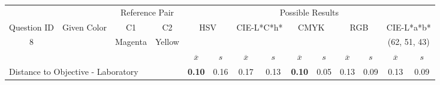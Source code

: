\begin{table}[H]
  \resizebox{\textwidth}{!} {
  \begin{tabular}{lccccccccccccc}
    \hline
    \multicolumn{1}{c}{}                              &                                      & \multicolumn{2}{c}{Reference Pair}                   & \multicolumn{10}{c}{Possible Results}                                                                                                                                                                                                                                                                                        \\ \cline{3-14}
    \multicolumn{1}{c}{\multirow{-2}{*}{Question ID}} & \multirow{-2}{*}{Given Color}        & C1                       & C2                         & \multicolumn{2}{c}{HSV}                                        & \multicolumn{2}{c}{CIE-L*C*h*}                                 & \multicolumn{2}{c}{CMYK}                                       & \multicolumn{2}{c}{RGB}                                        & \multicolumn{2}{c}{CIE-L*a*b*}                                 \\ \hline
    \multicolumn{1}{c}{8}                             & \cellcolor[HTML]{FF0000}{\color[HTML]{FFFFFF}(41, 21, 2)} & \multicolumn{1}{c|}{Magenta} & \multicolumn{1}{c|}{Yellow}  & \multicolumn{2}{c|}{\cellcolor[HTML]{FF0000}{\color[HTML]{FFFFFF}(41, 21, 2)}}      & \multicolumn{2}{c|}{\cellcolor[HTML]{FF6755}{\color[HTML]{FFFFFF}(48, 32, 12)}}       & \multicolumn{2}{c|}{\cellcolor[HTML]{FF8080}{\color[HTML]{FFFFFF}(53, 38, 25)}}       & \multicolumn{2}{c|}{\cellcolor[HTML]{FF8080}{\color[HTML]{FFFFFF}(53, 38, 25)}}       & \multicolumn{2}{c|}{\cellcolor[HTML]{FFA6A6}(62, 51, 43)}       \\ \hline
                                                      & \multicolumn{1}{l}{}                 & \multicolumn{1}{l}{}     & \multicolumn{1}{l}{}       & \multicolumn{1}{c}{$\overline{x}$} & \multicolumn{1}{c}{$s$} & \multicolumn{1}{c}{$\overline{x}$} & \multicolumn{1}{c}{$s$} & \multicolumn{1}{c}{$\overline{x}$} & \multicolumn{1}{c}{$s$} & \multicolumn{1}{c}{$\overline{x}$} & \multicolumn{1}{c}{$s$} & \multicolumn{1}{c}{$\overline{x}$} & \multicolumn{1}{c}{$s$} \\ \hline
    \multicolumn{4}{l}{Distance to Objective - Laboratory}                                                                                           & \multicolumn{1}{|c}{\textbf{0.10}}       & \multicolumn{1}{c|}{0.16}    & \multicolumn{1}{|c}{0.17}       & \multicolumn{1}{c|}{0.13}    & \multicolumn{1}{|c}{\textbf{0.10}}       & \multicolumn{1}{c|}{0.05}    & \multicolumn{1}{|c}{0.13}       & \multicolumn{1}{c|}{0.09}    & \multicolumn{1}{|c}{0.13}       & \multicolumn{1}{c|}{0.09}    \\

\end{tabular}}
\end{table}
